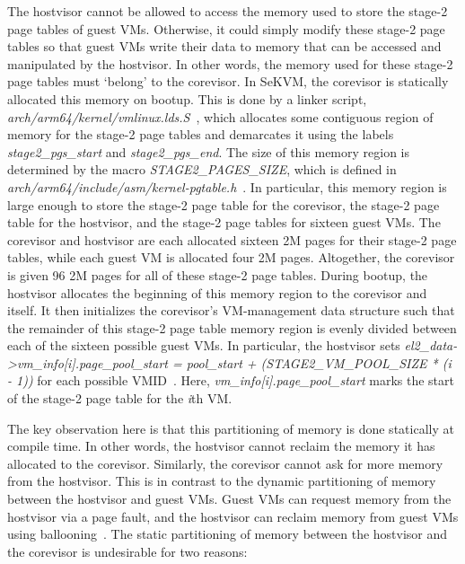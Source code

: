 The hostvisor cannot be allowed to access the memory used to store
the stage-2 page tables of guest VMs. Otherwise, it could simply modify these
stage-2 page tables so that guest VMs write their data to memory that can be
accessed and manipulated by the hostvisor. In other words, the memory used for
these stage-2 page tables must `belong' to the corevisor. In SeKVM,
the corevisor is statically allocated this memory on bootup. This is done by
a linker script, \textit{arch/arm64/kernel/vmlinux.lds.S}~\cite{vmlinux.lds.S}, which allocates some
contiguous region of memory for the stage-2 page tables and demarcates it using the labels \textit{stage2\_pgs\_start}
and \textit{stage2\_pgs\_end}. The size of this memory region is
determined by the macro \textit{STAGE2\_PAGES\_SIZE}, which is defined in
\textit{arch/arm64/include/asm/kernel-pgtable.h}~\cite{kernel-pgtable.h}. In
particular, this memory region is large enough to store the stage-2 page table
for the corevisor, the stage-2 page table for the hostvisor,
and the stage-2 page tables for sixteen guest VMs. The corevisor and hostvisor are
each allocated sixteen 2M pages for their stage-2 page tables, while each guest VM
is allocated four 2M pages. Altogether, the corevisor is given 96 2M
pages for all of these stage-2 page tables. During bootup, the hostvisor
allocates the beginning of this memory region to the corevisor and itself. It then 
initializes the corevisor's VM-management data structure such that the remainder of this stage-2 page table memory region
is evenly divided between each of the sixteen possible guest VMs. In particular, the hostvisor sets
\textit{el2\_data->vm\_info[i].page\_pool\_start =
pool\_start + (STAGE2\_VM\_POOL\_SIZE * (i - 1))} for each possible VMID~\cite{el1.c}.
Here, \textit{vm\_info[i].page\_pool\_start} marks the start of the stage-2
page table for the \textit{i}th VM.

The key observation here is that this partitioning of memory is done statically
at compile time. In other words, the hostvisor cannot reclaim the memory it has
allocated to the corevisor. Similarly, the corevisor cannot ask for more memory
from the hostvisor. This is in contrast to the dynamic partitioning of memory
between the hostvisor and guest VMs. Guest VMs can request memory from the
hostvisor via a page fault, and the hostvisor can reclaim memory from guest VMs
using ballooning~\cite{hypsec}. The static partitioning of memory between the
hostvisor and the corevisor is undesirable for two reasons:

